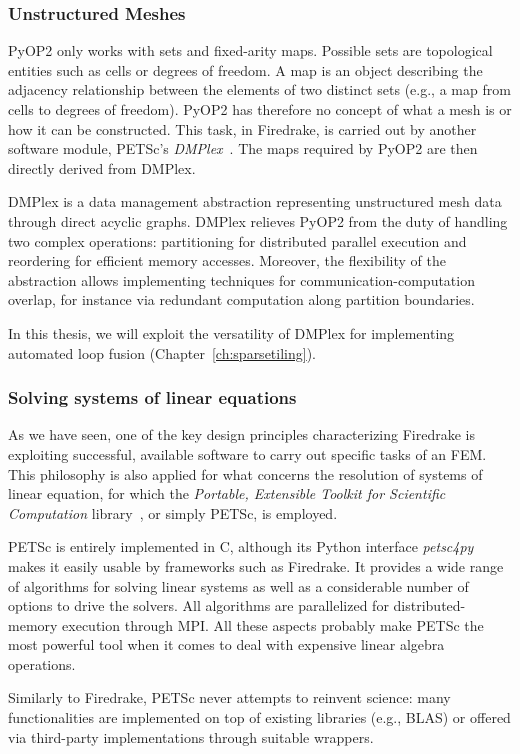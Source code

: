  \subsubsection{Unstructured Meshes}
PyOP2 only works with sets and fixed-arity maps. Possible sets are topological entities such as cells or degrees of freedom. A map is an object describing the adjacency relationship between the elements of two distinct sets (e.g., a map from cells to degrees of freedom). PyOP2 has therefore no concept of what a mesh is or how it can be constructed. This task, in Firedrake, is carried out by another software module, PETSc's {\em DMPlex}~\cite{dmplex-cite}. The maps required by PyOP2 are then directly derived from DMPlex. 
 
DMPlex is a data management abstraction representing unstructured mesh data through direct acyclic graphs. DMPlex relieves PyOP2 from the duty of handling two complex operations: partitioning for distributed parallel execution and reordering for efficient memory accesses.  Moreover, the flexibility of the abstraction allows implementing techniques for communication-computation overlap, for instance via redundant computation along partition boundaries. 

In this thesis, we will exploit the versatility of DMPlex for implementing automated loop fusion (Chapter~\ref{ch:sparsetiling}).
 
 \subsubsection{Solving systems of linear equations}
As we have seen, one of the key design principles characterizing Firedrake is exploiting successful, available software to carry out specific tasks of an FEM. This philosophy is also applied for what concerns the resolution of systems of linear equation, for which the {\em Portable, Extensible Toolkit for Scientific Computation} library~\cite{petsc-cite}, or simply PETSc, is employed. 

PETSc is entirely implemented in C, although its Python interface {\em petsc4py} makes it easily usable by frameworks such as Firedrake. It provides a wide range of algorithms for solving linear systems as well as a considerable number of options to drive the solvers. All algorithms are parallelized for distributed-memory execution through MPI. All these aspects probably make PETSc the most powerful tool when it comes to deal with expensive linear algebra operations. 

Similarly to Firedrake, PETSc never attempts to reinvent science: many functionalities are implemented on top of existing libraries (e.g., BLAS) or offered via third-party implementations through suitable wrappers.

